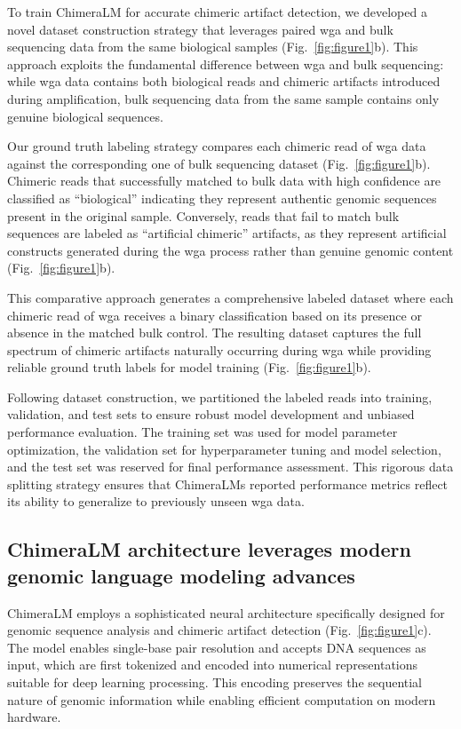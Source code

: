 \documentclass[pdflatex,sn-nature]{sn-jnl}%
\theoremstyle{thmstyleone}%
\theoremstyle{thmstyletwo}%
\theoremstyle{thmstylethree}%
\begin{document}
To train ChimeraLM for accurate chimeric artifact detection, we developed a novel dataset construction strategy that leverages paired \gls{wga} and bulk sequencing data from the same biological samples (Fig.~\ref{fig:figure1}b).
This approach exploits the fundamental difference between \gls{wga} and bulk sequencing: while \gls{wga} data contains both biological reads and chimeric artifacts introduced during amplification, bulk sequencing data from the same sample contains only genuine biological sequences.

Our ground truth labeling strategy compares each chimeric read of \gls{wga} data against the corresponding one of bulk sequencing dataset (Fig.~\ref{fig:figure1}b).
Chimeric reads that successfully matched to bulk data with high confidence are classified as ``biological'' indicating they represent authentic genomic sequences present in the original sample.
Conversely, reads that fail to match bulk sequences are labeled as ``artificial chimeric'' artifacts, as they represent artificial constructs generated during the \gls{wga} process rather than genuine genomic content (Fig.~\ref{fig:figure1}b).

This comparative approach generates a comprehensive labeled dataset where each chimeric read of \gls{wga} receives a binary classification based on its presence or absence in the matched bulk control.
The resulting dataset captures the full spectrum of chimeric artifacts naturally occurring during \gls{wga}  while providing reliable ground truth labels for model training (Fig.~\ref{fig:figure1}b).

Following dataset construction, we partitioned the labeled reads into training, validation, and test sets to ensure robust model development and unbiased performance evaluation.
The training set was used for model parameter optimization, the validation set for hyperparameter tuning and model selection, and the test set was reserved for final performance assessment.
This rigorous data splitting strategy ensures that ChimeraLM\textquotesingle s reported performance metrics reflect its ability to generalize to previously unseen \gls{wga} data.

\subsection*{ChimeraLM architecture leverages modern genomic language modeling advances}

ChimeraLM employs a sophisticated neural architecture specifically designed for genomic sequence analysis and chimeric artifact detection (Fig.~\ref{fig:figure1}c).
The model enables single-base pair resolution and accepts DNA sequences as input, which are first tokenized and encoded into numerical representations suitable for deep learning processing.
This encoding preserves the sequential nature of genomic information while enabling efficient computation on modern hardware.
\end{document}
